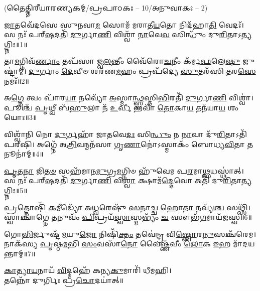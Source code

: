 
\vspace{-1ex}
\centerline{\scriptsize (𑌤𑍈𑌤𑍍𑌤𑌿𑌰𑍀𑌯𑌾𑌰𑌣𑍍𑌯𑌕𑌮𑍍/𑌪𑍍𑌰𑌪𑌾𑌠𑌕𑌃 – 10/𑌅𑌨𑍁𑌵𑌾𑌕𑌃 – 2)}

\-\ul{𑌜𑌾}\-𑌤𑌵𑍇᳴𑌦𑌸𑍇 𑌸𑍁𑌨𑌵𑌾\-\ul{𑌮} 𑌸𑍋𑌮᳴ 𑌮𑌰𑌾𑌤𑍀\-\ul{𑌯}\-𑌤𑍋 𑌨𑌿𑌦᳴𑌹𑌾\-\ul{𑌤𑌿} 𑌵𑍇𑌦𑌃᳴।
𑌸 𑌨𑌃᳴ 𑌪𑌰𑍍‌\-\ul{𑌷}\-𑌦𑌤𑌿᳴ \ul{𑌦𑍁}\-𑌰𑍍𑌗𑌾\-\ul{𑌣𑌿} 𑌵𑌿𑌶𑍍𑌵𑌾᳴ \ul{𑌨𑌾}\-𑌵𑍇\-\ul{𑌵} 𑌸𑌿𑌨𑍍𑌧𑍁𑌂᳴ 𑌦𑍁\-\ul{𑌰𑌿}\-𑌤𑌾𑌽\-\ul{𑌤𑍍𑌯}\-𑌗𑍍𑌨𑌿𑌃॥1॥

𑌤𑌾\-\ul{𑌮}\-𑌗𑍍𑌨𑌿𑌵᳴\-\ul{𑌰𑍍𑌣𑌾𑌂} 𑌤𑌪᳴𑌸𑌾 𑌜𑍍𑌵\-\ul{𑌲}\-𑌨𑍍𑌤𑍀𑌂 𑌵𑍈᳴𑌰𑍋\-\ul{𑌚}\-𑌨𑍀𑌂 𑌕᳴𑌰𑍍𑌮\-\ul{𑌫}\-𑌲𑍇\-\ul{𑌷𑍁} 𑌜𑍁𑌷𑍍𑌟𑌾॑𑌮𑍍।
\-\ul{𑌦𑍁}\-𑌰𑍍𑌗𑌾𑌂 \ul{𑌦𑍇}\-𑌵𑍀𑍞 𑌶𑌰᳴𑌣\-\ul{𑌮}\-𑌹𑌂 𑌪𑍍𑌰𑌪᳴𑌦𑍍𑌯𑍇 \ul{𑌸𑍁}\-𑌤𑌰᳴𑌸𑌿 𑌤𑌰\-\ul{𑌸𑍇} 𑌨𑌮𑌃᳴॥2॥

𑌅\-\ul{𑌗𑍍𑌨𑍇} 𑌤𑍍𑌵𑌂 𑌪𑌾᳴𑌰\-\ul{𑌯𑌾} 𑌨𑌵𑍍𑌯𑍋᳴ \ul{𑌅}\-𑌸𑍍𑌮𑌾\-\ul{𑌨𑍍𑌥𑍍𑌸𑍍𑌵}\-𑌸𑍍𑌤𑌿\-\ul{𑌭𑌿}\-𑌰𑌤𑌿᳴ \ul{𑌦𑍁}\-𑌰𑍍𑌗𑌾\-\ul{𑌣𑌿} 𑌵𑌿𑌶𑍍𑌵𑌾॑।
𑌪𑍂𑌶𑍍𑌚᳴ \ul{𑌪𑍃}\-𑌥𑍍𑌵𑍀 𑌬᳴\-\ul{𑌹𑍁}\-𑌲𑌾 𑌨᳴ \ul{𑌉}\-𑌰𑍍𑌵𑍀 𑌭𑌵𑌾᳴ \ul{𑌤𑍋}\-𑌕𑌾\-\ul{𑌯} 𑌤𑌨᳴𑌯𑌾\-\ul{𑌯} 𑌶𑌂 𑌯𑍋𑌃॥3॥

𑌵𑌿𑌶𑍍𑌵𑌾᳴𑌨𑌿 𑌨𑍋 \ul{𑌦𑍁}\-𑌰𑍍𑌗𑌹𑌾᳴ 𑌜𑌾𑌤𑌵𑍇\-\ul{𑌦𑌃} 𑌸𑌿\-\ul{𑌨𑍍𑌧𑍁𑌂} 𑌨 \ul{𑌨𑌾}\-𑌵𑌾 𑌦𑍁᳴\-\ul{𑌰𑌿}\-𑌤𑌾𑌽𑌤𑌿᳴𑌪𑌰𑍍‌\mbox{}𑌷𑌿।
𑌅𑌗𑍍𑌨𑍇᳴ 𑌅\-\ul{𑌤𑍍𑌰𑌿}\-𑌵𑌨𑍍𑌮𑌨᳴𑌸𑌾 𑌗𑍃\-\ul{𑌣𑌾}\-𑌨𑍋॑𑌽𑌸𑍍𑌮𑌾𑌕𑌂᳴ 𑌬𑍋𑌧𑍍𑌯\-\ul{𑌵𑌿}\-𑌤𑌾 \ul{𑌤}\-𑌨𑍂𑌨𑌾॑𑌮𑍍॥4॥

\-\ul{𑌪𑍃}\-\-\ul{𑌤}\-\-\ul{𑌨𑌾} 𑌜𑌿\-\ul{𑌤}\-\-\ul{𑍞} 𑌸𑌹᳴𑌮𑌾𑌨\-\ul{𑌮𑍁}\-𑌗𑍍𑌰\-\ul{𑌮}\-𑌗𑍍𑌨𑌿𑍞 𑌹𑍁᳴𑌵𑍇𑌮 𑌪\-\ul{𑌰}\-𑌮𑌾\-\ul{𑌥𑍍𑌸}\-𑌧𑌸𑍍𑌥𑌾॑𑌤𑍍।
𑌸 𑌨𑌃᳴ 𑌪𑌰𑍍‌\-\ul{𑌷}\-𑌦𑌤𑌿᳴ \ul{𑌦𑍁}\-𑌰𑍍𑌗𑌾\-\ul{𑌣𑌿} 𑌵𑌿\-\ul{𑌶𑍍𑌵𑌾} 𑌕𑍍𑌷𑌾𑌮᳴\-\ul{𑌦𑍍𑌦𑍇}\-𑌵𑍋 𑌅𑌤𑌿᳴ 𑌦𑍁\-\ul{𑌰𑌿}\-𑌤𑌾\-\ul{𑌤𑍍𑌯}\-𑌗𑍍𑌨𑌿𑌃॥5॥

\-\ul{𑌪𑍍𑌰}\-𑌤𑍍𑌨𑍋𑌷𑌿᳴ \ul{𑌕}\-𑌮𑍀𑌡𑍍𑌯𑍋᳴ 𑌅\-\ul{𑌧𑍍𑌵}\-𑌰𑍇𑌷𑍁᳴ \ul{𑌸}\-𑌨𑌾\-\ul{𑌚𑍍𑌚} 𑌹𑍋\-\ul{𑌤𑌾} 𑌨𑌵𑍍𑌯᳴\-\ul{𑌶𑍍𑌚} 𑌸𑌥𑍍𑌸𑌿᳴।
𑌸𑍍𑌵𑌾𑌞𑍍𑌚𑌾॑𑌗𑍍𑌨𑍇 \ul{𑌤}\-𑌨𑍁𑌵𑌂᳴ \ul{𑌪𑌿}\-𑌪𑍍𑌰𑌯᳴\-\ul{𑌸𑍍𑌵𑌾}\-𑌸𑍍𑌮𑌭𑍍𑌯𑌂᳴ \ul{𑌚} 𑌸𑍗𑌭᳴\-\ul{𑌗}\-𑌮𑌾𑌯᳴𑌜𑌸𑍍𑌵॥6॥

𑌗𑍋\-\ul{𑌭𑌿}\-𑌰𑍍𑌜𑍁𑌷𑍍𑌟᳴\-\ul{𑌮}\-𑌯𑍁\-\ul{𑌜𑍋} 𑌨𑌿𑌷𑌿᳴\-\ul{𑌕𑍍𑌤𑌂} 𑌤𑌵𑍇॑𑌨𑍍𑌦𑍍𑌰 𑌵𑌿\-\ul{𑌷𑍍𑌣𑍋}\-𑌰\-\ul{𑌨𑍁}\-𑌸𑌞𑍍𑌚᳴𑌰𑍇𑌮।
𑌨𑌾𑌕᳴𑌸𑍍𑌯 \ul{𑌪𑍃}\-𑌷𑍍𑌠\-\ul{𑌮}\-𑌭𑌿 \ul{𑌸𑌂}\-𑌵𑌸𑌾᳴\-\ul{𑌨𑍋} 𑌵𑍈𑌷𑍍𑌣᳴𑌵𑍀𑌂 \ul{𑌲𑍋}\-𑌕 \ul{𑌇}\-𑌹 𑌮𑌾᳴𑌦𑌯𑌨𑍍𑌤𑌾𑌮𑍍॥7॥
\vspace{-0.5ex}
\begin{center}
\-\ul{𑌕𑌾}\-\-\ul{𑌤𑍍𑌯𑌾}\-\-\ul{𑌯}\-𑌨𑌾𑌯᳴ \ul{𑌵𑌿}\-𑌦𑍍𑌮𑌹𑍇᳴ 𑌕𑌨𑍍𑌯\-\ul{𑌕𑍁}\-𑌮𑌾𑌰𑌿᳴ 𑌧𑍀𑌮𑌹𑌿।\\
 𑌤𑌨𑍍𑌨𑍋᳴ 𑌦𑍁𑌰𑍍𑌗𑌿𑌃 𑌪𑍍𑌰\-\ul{𑌚𑍋}\-𑌦𑌯𑌾॑𑌤𑍍॥ 
\end{center}
